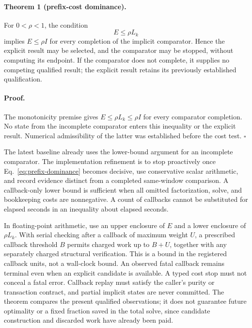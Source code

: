 \paragraph{Theorem 1 (prefix-cost dominance).}
For $0<\rho<1$, the condition
\begin{equation}
 E\leq \rho L_k
 \label{eq:prefix-dominance}
\end{equation}
implies $E\leq\rho I$ for every completion of the implicit comparator.  Hence
the explicit result may be selected, and the comparator may be stopped,
without computing its endpoint.  If the comparator does not complete, it
supplies no competing qualified result; the explicit result retains its
previously established qualification.

\paragraph{Proof.}
The monotonicity premise gives
$E\leq\rho L_k\leq\rho I$ for every comparator completion.  No state from the
incomplete comparator enters this inequality or the explicit result.
Numerical admissibility of the latter was established before the cost test.
\hfill$\square$

The latest baseline already uses the lower-bound argument for an incomplete
comparator.  The implementation refinement is to stop proactively once
Eq.~\eqref{eq:prefix-dominance} becomes decisive, use conservative scalar
arithmetic, and record evidence distinct from a completed same-window
comparison.  A callback-only lower bound is sufficient when all omitted
factorization, solve, and bookkeeping costs are nonnegative.  A count of
callbacks cannot be substituted for elapsed seconds in an inequality about
elapsed seconds.

In floating-point arithmetic, use an upper enclosure of $E$ and a lower
enclosure of $\rho L_k$.  With serial checking after a callback of maximum
weight $U$, a prescribed callback threshold $B$ permits charged work up to
$B+U$, together with any separately charged structural verification.  This is
a bound in the registered callback units, not a wall-clock bound.
An observed fatal callback remains terminal even when an explicit candidate
is available.  A typed cost stop must not conceal a fatal error.  Callback
replay must satisfy the caller's purity or transaction contract, and partial
implicit states are never committed.  The theorem compares the present
qualified observations; it does not guarantee future optimality or a fixed
fraction saved in the total solve, since candidate construction and discarded
work have already been paid.

